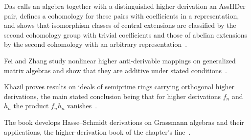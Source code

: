 Das calls an algebra together with a distinguished higher derivation an AssHDer pair, defines a cohomology for these pairs with coefficients in a representation, and shows that isomorphism classes of central extensions are classified by the second cohomology group with trivial coefficients and those of abelian extensions by the second cohomology with an arbitrary representation~\cite{WlExtensionsAndDeformationsOfAlg2022}.

Fei and Zhang study nonlinear higher anti-derivable mappings on generalized matrix algebras and show that they are additive under stated conditions~\cite{WlAdditivityOfNonlinearHigherAnt2023}.

Khazil proves results on ideals of semiprime rings carrying orthogonal higher derivations, the main stated conclusion being that for higher derivations $f_n$ and $h_n$ the product $f_nh_n$ vanishes~\cite{WlIdealOfSemiPrimeRingsWithOrtho2021}.

The book develops Hasse--Schmidt derivations on Grassmann algebras and their applications, the higher-derivation book of the chapter's line~\cite{WlHasseSchmidtDerivationsOnGrass2020}.
